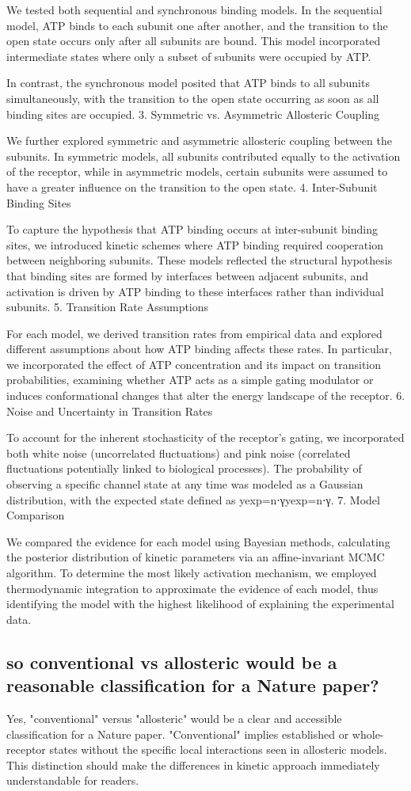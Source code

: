 \documentclass[pdflatex,sn-mathphys-num]{sn-jnl}%
\theoremstyle{thmstyleone}%
\theoremstyle{thmstyletwo}%
\theoremstyle{thmstylethree}%
\begin{document}
We tested both sequential and synchronous binding models. In the sequential model, ATP binds to each subunit one after another, and the transition to the open state occurs only after all subunits are bound. This model incorporated intermediate states where only a subset of subunits were occupied by ATP.

In contrast, the synchronous model posited that ATP binds to all subunits simultaneously, with the transition to the open state occurring as soon as all binding sites are occupied.
3. Symmetric vs. Asymmetric Allosteric Coupling

We further explored symmetric and asymmetric allosteric coupling between the subunits. In symmetric models, all subunits contributed equally to the activation of the receptor, while in asymmetric models, certain subunits were assumed to have a greater influence on the transition to the open state.
4. Inter-Subunit Binding Sites

To capture the hypothesis that ATP binding occurs at inter-subunit binding sites, we introduced kinetic schemes where ATP binding required cooperation between neighboring subunits. These models reflected the structural hypothesis that binding sites are formed by interfaces between adjacent subunits, and activation is driven by ATP binding to these interfaces rather than individual subunits.
5. Transition Rate Assumptions

For each model, we derived transition rates from empirical data and explored different assumptions about how ATP binding affects these rates. In particular, we incorporated the effect of ATP concentration and its impact on transition probabilities, examining whether ATP acts as a simple gating modulator or induces conformational changes that alter the energy landscape of the receptor.
6. Noise and Uncertainty in Transition Rates

To account for the inherent stochasticity of the receptor's gating, we incorporated both white noise (uncorrelated fluctuations) and pink noise (correlated fluctuations potentially linked to biological processes). The probability of observing a specific channel state at any time was modeled as a Gaussian distribution, with the expected state defined as yexp=n⋅γyexp​=n⋅γ.
7. Model Comparison

We compared the evidence for each model using Bayesian methods, calculating the posterior distribution of kinetic parameters via an affine-invariant MCMC algorithm. To determine the most likely activation mechanism, we employed thermodynamic integration to approximate the evidence of each model, thus identifying the model with the highest likelihood of explaining the experimental data.

\subsection{so conventional vs allosteric would be a reasonable classification for a Nature paper?}
Yes, "conventional" versus "allosteric" would be a clear and accessible classification for a Nature paper. "Conventional" implies established or whole-receptor states without the specific local interactions seen in allosteric models. This distinction should make the differences in kinetic approach immediately understandable for readers.
\end{document}
